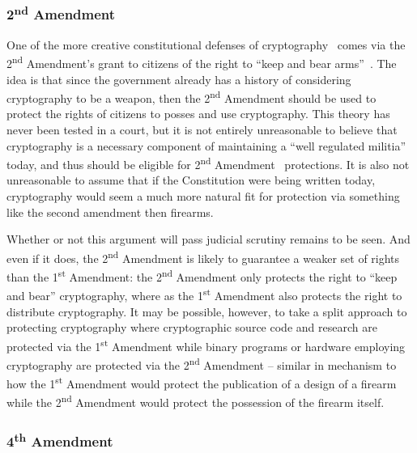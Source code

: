 \subsubsection{2\textsuperscript{nd} Amendment}

One of the more creative constitutional defenses of
cryptography~\cite{xkcd-504} comes via the 2\textsuperscript{nd}
Amendment's grant to citizens of the right to ``keep and bear
arms''~\cite{us-constitution-amend2}. The idea is that since the
government already has a history of considering cryptography to be a
weapon, then the 2\textsuperscript{nd} Amendment should be used to
protect the rights of citizens to posses and use cryptography. This
theory has never been tested in a court, but it is not entirely
unreasonable to believe that cryptography is a necessary component of
maintaining a ``well regulated militia'' today, and thus should be
eligible for 2\textsuperscript{nd}
Amendment~\cite{scotus-usvmiller-guns} protections. It is also not
unreasonable to assume that if the Constitution were being written
today, cryptography would seem a much more natural fit for protection
via something like the second amendment then firearms.

Whether or not this argument will pass judicial scrutiny remains to be
seen. And even if it does, the 2\textsuperscript{nd} Amendment is
likely to guarantee a weaker set of rights than the
1\textsuperscript{st} Amendment: the 2\textsuperscript{nd} Amendment
only protects the right to ``keep and bear'' cryptography, where as
the 1\textsuperscript{st} Amendment also protects the right to
distribute cryptography. It may be possible, however, to take a split
approach to protecting cryptography where cryptographic source code
and research are protected via the 1\textsuperscript{st} Amendment
while binary programs or hardware employing cryptography are protected
via the 2\textsuperscript{nd} Amendment -- similar in mechanism to how
the 1\textsuperscript{st} Amendment would protect the publication of a
design of a firearm while the 2\textsuperscript{nd} Amendment would
protect the possession of the firearm itself.


\subsubsection{4\textsuperscript{th} Amendment}

